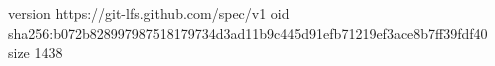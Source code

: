 version https://git-lfs.github.com/spec/v1
oid sha256:b072b828997987518179734d3ad11b9c445d91efb71219ef3ace8b7ff39fdf40
size 1438
